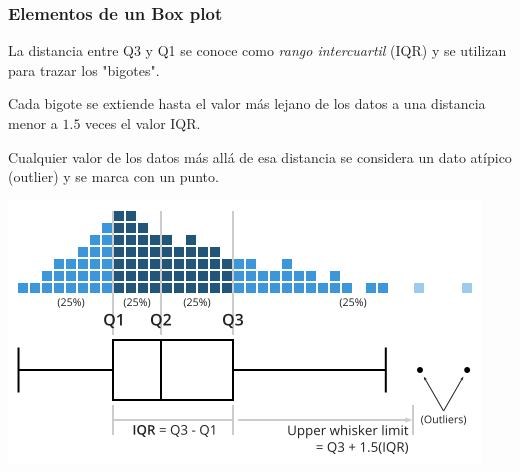\documentclass[aspectratio=169,12pt]{beamer}
\begin{document}
\begin{frame}
\frametitle{Elementos de un Box plot}

La distancia entre Q3 y Q1 se conoce como \emph{rango intercuartil} (IQR) y se utilizan para trazar los "bigotes".
 
Cada bigote se extiende hasta el valor más lejano de los datos a una distancia menor a $1.5$ veces el valor IQR. 

Cualquier valor de los datos más allá de esa distancia se considera un dato atípico (outlier) y se marca con un punto.

\begin{center}
\includegraphics[scale=.35]{clase4-box-plot-construction.png}
\end{center}

\end{frame}
\end{document}
